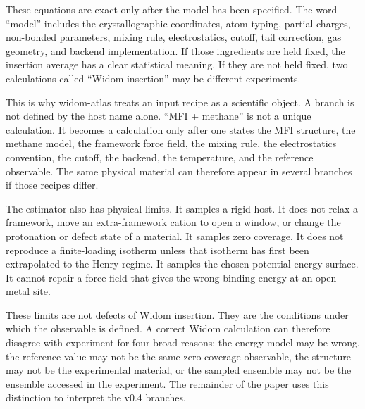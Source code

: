 These equations are exact only after the model has been specified. The word ``model'' includes the crystallographic coordinates, atom typing, partial charges, non-bonded parameters, mixing rule, electrostatics, cutoff, tail correction, gas geometry, and backend implementation. If those ingredients are held fixed, the insertion average has a clear statistical meaning. If they are not held fixed, two calculations called ``Widom insertion'' may be different experiments.

This is why widom-atlas treats an input recipe as a scientific object. A branch is not defined by the host name alone. ``MFI + methane'' is not a unique calculation. It becomes a calculation only after one states the MFI structure, the methane model, the framework force field, the mixing rule, the electrostatics convention, the cutoff, the backend, the temperature, and the reference observable. The same physical material can therefore appear in several branches if those recipes differ.

The estimator also has physical limits. It samples a rigid host. It does not relax a framework, move an extra-framework cation to open a window, or change the protonation or defect state of a material. It samples zero coverage. It does not reproduce a finite-loading isotherm unless that isotherm has first been extrapolated to the Henry regime. It samples the chosen potential-energy surface. It cannot repair a force field that gives the wrong binding energy at an open metal site.

These limits are not defects of Widom insertion. They are the conditions under which the observable is defined. A correct Widom calculation can therefore disagree with experiment for four broad reasons: the energy model may be wrong, the reference value may not be the same zero-coverage observable, the structure may not be the experimental material, or the sampled ensemble may not be the ensemble accessed in the experiment. The remainder of the paper uses this distinction to interpret the v0.4 branches.
